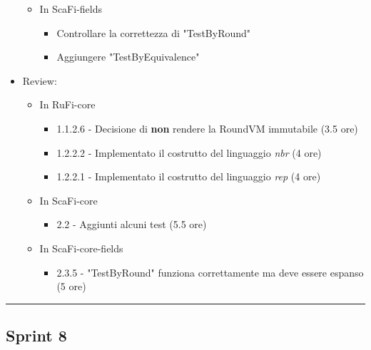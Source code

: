 \documentclass[12pt, a4paper]{article}
\begin{document}
\begin{itemize}
\begin{itemize}
              \item In ScaFi-fields
                    \begin{itemize}
                        \item Controllare la correttezza di "TestByRound"
                        \item Aggiungere "TestByEquivalence"
                    \end{itemize}
          \end{itemize}
    \item Review:
          \begin{itemize}
              \color{teal}
              \item In RuFi-core
                    \begin{itemize}
                        \item 1.1.2.6 - Decisione di \textbf{non} rendere la RoundVM immutabile (3.5 ore)
                        \item 1.2.2.2 - Implementato il costrutto del linguaggio \textit{nbr} (4 ore)
                        \item 1.2.2.1 - Implementato il costrutto del linguaggio \textit{rep} (4 ore)
                    \end{itemize}
                    \color{cyan}
              \item In ScaFi-core
                    \begin{itemize}
                        \item 2.2 - Aggiunti alcuni test (5.5 ore)
                    \end{itemize}
                    \color{cyan}
              \item In ScaFi-core-fields
                    \begin{itemize}
                        \item 2.3.5 - "TestByRound" funziona correttamente ma deve essere espanso (5 ore)
                    \end{itemize}
          \end{itemize}
\end{itemize}

\par\noindent\rule{\textwidth}{0.5pt}


\subsection*{Sprint 8}
\end{document}
